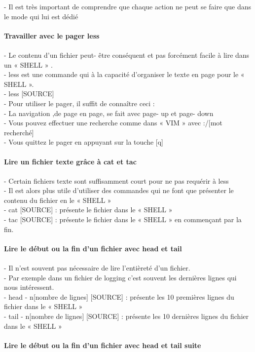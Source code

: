 \documentclass[10pt,a4paper]{article}
\begin{document}
- Il est très important de comprendre que chaque action ne peut se faire que dans le mode qui lui est dédié\\\\
{\large\textbf{Travailler avec le pager less }}\\\\
- Le contenu d’un fichier peut- être conséquent et pas forcément facile à lire dans un « SHELL » .\\
- less est une commande qui à la capacité d’organiser le texte en page pour le « SHELL ».  \\
- less [SOURCE] \\
- Pour utiliser le pager, il suffit de connaître ceci : \\
- La navigation ,de page en page, se fait avec page- up et page- down \\
- Vous pouvez effectuer une recherche comme dans « VIM » avec :/[mot recherché] \\
- Vous quittez le pager en appuyant sur la touche [q] \\\\
{\large\textbf{Lire un fichier texte grâce à cat et tac}}\\\\
- Certain fichiers texte sont suffisamment court pour ne pas requérir à less \\
- Il est alors plus utile d’utiliser des commandes qui ne font que présenter le contenu du fichier en le « SHELL » \\
- cat [SOURCE] : présente le fichier dans le « SHELL »\\
- tac [SOURCE] : présente le fichier dans le « SHELL » en commençant par la fin.\\\\
{\large\textbf{Lire le début ou la fin d’un fichier avec head et tail }}\\\\
- Il n’est souvent pas nécessaire de lire l’entièreté d’un fichier.\\
- Par exemple dans un fichier de logging c’est souvent les dernières lignes qui nous intéressent. \\
- head - n[nombre de lignes] [SOURCE] : présente les 10 premières lignes du fichier dans le « SHELL » \\
- tail - n[nombre de lignes] [SOURCE] : présente les 10 dernières lignes du fichier dans le « SHELL »\\\\
{\large\textbf{Lire le début ou la fin d’un fichier avec head et tail suite}}\\\\
\end{document}
